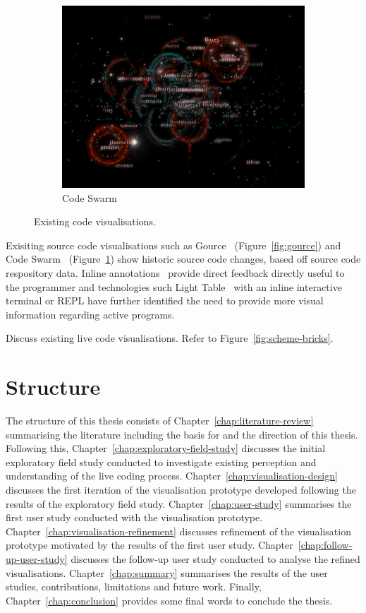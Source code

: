 \begin{figure}
\begin{subfigure}{.5\textwidth}
  \includegraphics[width=.95\linewidth]{../images/code-visualisations/code-swarm.png}
  \caption{Code Swarm}
  \label{fig:code-swarm}
\end{subfigure}%

\caption{Existing code visualisations.}
\label{fig:code-visualisations}
\end{figure}

Exisiting source code visualisations such as Gource~\cite{Caudwell2010} (Figure~\ref{fig:gource}) and Code Swarm~\cite{Ogawa2012} (Figure~\ref{fig:code-swarm}) show historic source code changes, based off source code respository data. Inline annotations~\cite{Swift2013} provide direct feedback directly useful to the programmer and technologies such Light Table~\cite{Kodowa2014} with an inline interactive terminal or \ac{REPL} have further identified the need to provide more visual information regarding active programs.

\more Discuss existing live code visualisations. Refer to Figure~\ref{fig:scheme-bricks}.

\section{Structure}

The structure of this thesis consists of Chapter~\ref{chap:literature-review} summarising the literature including the basis for and the direction of this thesis. Following this, Chapter~\ref{chap:exploratory-field-study} discusses the initial exploratory field study conducted to investigate existing perception and understanding of the live coding process. Chapter~\ref{chap:visualisation-design} discusses the first iteration of the visualisation prototype developed following the results of the exploratory field study. Chapter~\ref{chap:user-study} summarises the first user study conducted with the visualisation prototype. Chapter~\ref{chap:visualisation-refinement} discusses refinement of the visualisation prototype motivated by the results of the first user study. Chapter~\ref{chap:follow-up-user-study} discusses the follow-up user study conducted to analyse the refined visualisations. Chapter~\ref{chap:summary} summarises the results of the user studies, contributions, limitations and future work. Finally, Chapter~\ref{chap:conclusion} provides some final words to conclude the thesis.

